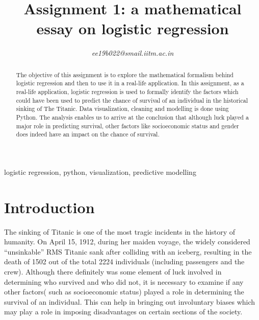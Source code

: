 \documentclass[conference]{IEEEtran}
\begin{document}
\title{Assignment 1: a mathematical essay on logistic regression\\}


\author{
\textit{ee19b022@smail.iitm.ac.in}

}

\maketitle

\begin{abstract}
The objective of this assignment is to explore the mathematical formalism behind logistic regression and then to use it in a real-life application. In this assignment, as a real-life application, logistic regression is used to formally identify the factors which could have been used to  predict the chance of survival of an individual in the historical sinking of The Titanic. Data visualization, cleaning and modelling is done using Python. The analysis enables us to arrive at the conclusion that although luck played a major role in predicting survival, other factors like socioeconomic status and gender does indeed have an impact on the chance of survival. 
\end{abstract}

\begin{IEEEkeywords}
logistic regression, python, visualization, predictive modelling
\end{IEEEkeywords}

\section{Introduction}

The sinking of Titanic is one of the most tragic incidents in the history of humanity. On April 15, 1912, during her maiden voyage, the widely considered “unsinkable” RMS Titanic sank after colliding with an iceberg, resulting in the death of 1502 out of the total 2224 individuals (including passengers and the crew). Although there definitely was some element of luck involved in determining who survived and who did not, it is necessary to examine if any other factors( such as socioeconomic status) played a role in determining the survival of an individual. This can help in bringing out involuntary biases which may play a role in imposing disadvantages on certain sections of the society.
\end{document}
